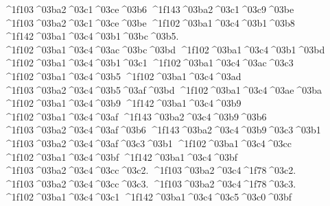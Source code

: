 {	^^^^1f103^^^^03ba2^^^^03c1^^^^03ce^^^^03b6
	^^^^1f143^^^^03ba2^^^^03c1^^^^03c9^^^^03be  		%
	^^^^1f103^^^^03ba2^^^^03c1^^^^03ce^^^^03be
^^^^1f102^^^^03ba1^^^^03c4^^^^03b1^^^^03b8  		%
^^^^1f142^^^^03ba1^^^^03c4^^^^03b1^^^^03bc^^^^03b5. 		%
^^^^1f102^^^^03ba1^^^^03c4^^^^03ac^^^^03bc^^^^03bd  		%
^^^^1f102^^^^03ba1^^^^03c4^^^^03b1^^^^03bd    		%
^^^^1f102^^^^03ba1^^^^03c4^^^^03b1^^^^03c1   		%
^^^^1f102^^^^03ba1^^^^03c4^^^^03ac^^^^03c3   		%
^^^^1f102^^^^03ba1^^^^03c4^^^^03b5
^^^^1f102^^^^03ba1^^^^03c4^^^^03ad
	^^^^1f103^^^^03ba2^^^^03c4^^^^03b5^^^^03af^^^^03bd		%
^^^^1f102^^^^03ba1^^^^03c4^^^^03ae^^^^03ba   		%
^^^^1f102^^^^03ba1^^^^03c4^^^^03b9
^^^^1f142^^^^03ba1^^^^03c4^^^^03b9
^^^^1f102^^^^03ba1^^^^03c4^^^^03af
	^^^^1f143^^^^03ba2^^^^03c4^^^^03b9^^^^03b6		%
	^^^^1f103^^^^03ba2^^^^03c4^^^^03af^^^^03b6
	^^^^1f143^^^^03ba2^^^^03c4^^^^03b9^^^^03c3^^^^03b1		%
	^^^^1f103^^^^03ba2^^^^03c4^^^^03af^^^^03c3^^^^03b1
^^^^1f102^^^^03ba1^^^^03c4^^^^03cc
^^^^1f102^^^^03ba1^^^^03c4^^^^03bf
^^^^1f142^^^^03ba1^^^^03c4^^^^03bf
	^^^^1f103^^^^03ba2^^^^03c4^^^^03cc^^^^03c2.		%
	^^^^1f103^^^^03ba2^^^^03c4^^^^1f78^^^^03c2.
	^^^^1f103^^^^03ba2^^^^03c4^^^^03cc^^^^03c3.
	^^^^1f103^^^^03ba2^^^^03c4^^^^1f78^^^^03c3.
^^^^1f102^^^^03ba1^^^^03c4^^^^03c1
^^^^1f142^^^^03ba1^^^^03c4^^^^03c5^^^^03c0^^^^03bf  		%
}
